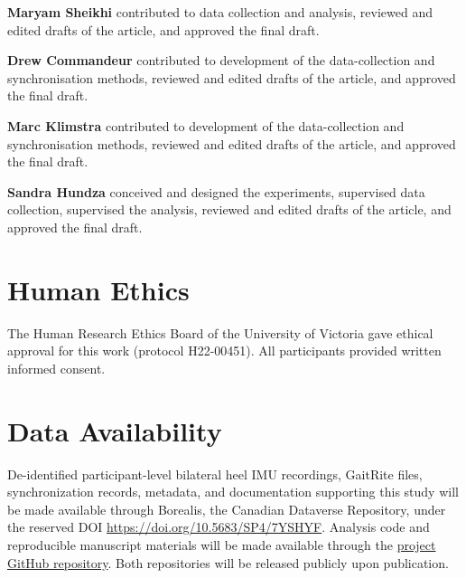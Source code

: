 \documentclass[fleqn,10pt,lineno]{wlpeerj}
\begin{document}
\textbf{Maryam Sheikhi} contributed to data collection and analysis, reviewed and edited drafts of the article, and approved the final draft.

\textbf{Drew Commandeur} contributed to development of the data-collection and synchronisation methods, reviewed and edited drafts of the article, and approved the final draft.

\textbf{Marc Klimstra} contributed to development of the data-collection and synchronisation methods, reviewed and edited drafts of the article, and approved the final draft.

\textbf{Sandra Hundza} conceived and designed the experiments, supervised data collection, supervised the analysis, reviewed and edited drafts of the article, and approved the final draft.

\section*{Human Ethics}

The Human Research Ethics Board of the University of Victoria gave ethical approval for this work (protocol H22-00451). All participants provided written informed consent.

\clearpage
\section*{Data Availability}

De-identified participant-level bilateral heel IMU recordings, GaitRite files, synchronization records, metadata, and documentation supporting this study will be made available through Borealis, the Canadian Dataverse Repository, under the reserved DOI \url{https://doi.org/10.5683/SP4/7YSHYF}. Analysis code and reproducible manuscript materials will be made available through the \href{https://github.com/pkudzia/manuscript-heel-imu-stride-length-validation}{project GitHub repository}. Both repositories will be released publicly upon publication.



\end{document}
